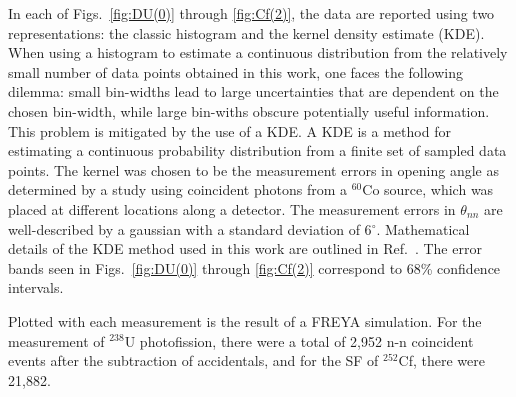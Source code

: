 In each of Figs.~\ref{fig:DU(0)} through \ref{fig:Cf(2)}, the data are reported using two representations: the classic histogram and the kernel density estimate (KDE).
When using a histogram to estimate a continuous distribution from the relatively small number of data points obtained in this work, one faces the following dilemma: small bin-widths lead to large uncertainties that are dependent on the chosen bin-width, while large bin-withs obscure potentially useful information. 
This problem is mitigated by the use of a KDE.
A KDE is a method for estimating a continuous probability distribution from a finite set of sampled data points.
The kernel was chosen to be the measurement errors in opening angle as determined by a study using coincident photons from a $^{60}$Co source, which was placed at different locations along a detector.
The measurement errors in $\theta_{nn}$ are well-described by a gaussian with a standard deviation of 6$^{\circ}$.
Mathematical details of the KDE method used in this work are outlined in Ref.~\cite{KDE}.
The error bands seen in Figs.~\ref{fig:DU(0)} through \ref{fig:Cf(2)} correspond to 68\% confidence intervals.

Plotted with each measurement is the result of a FREYA simulation.
For the measurement of $^{238}$U photofission, there were a total of 2,952 n-n coincident events after the subtraction of accidentals, and for the SF of $^{252}$Cf, there were  21,882.


